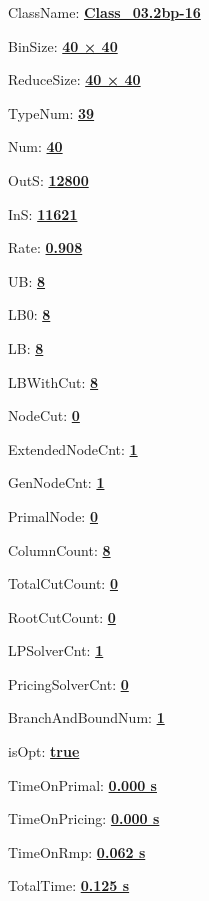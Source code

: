 \documentclass[11pt]{article}
\begin{document}
\pagestyle{empty}


ClassName: \underline{\textbf{Class_03.2bp-16}}
\par
BinSize: \underline{\textbf{40 × 40}}
\par
ReduceSize: \underline{\textbf{40 × 40}}
\par
TypeNum: \underline{\textbf{39}}
\par
Num: \underline{\textbf{40}}
\par
OutS: \underline{\textbf{12800}}
\par
InS: \underline{\textbf{11621}}
\par
Rate: \underline{\textbf{0.908}}
\par
UB: \underline{\textbf{8}}
\par
LB0: \underline{\textbf{8}}
\par
LB: \underline{\textbf{8}}
\par
LBWithCut: \underline{\textbf{8}}
\par
NodeCut: \underline{\textbf{0}}
\par
ExtendedNodeCnt: \underline{\textbf{1}}
\par
GenNodeCnt: \underline{\textbf{1}}
\par
PrimalNode: \underline{\textbf{0}}
\par
ColumnCount: \underline{\textbf{8}}
\par
TotalCutCount: \underline{\textbf{0}}
\par
RootCutCount: \underline{\textbf{0}}
\par
LPSolverCnt: \underline{\textbf{1}}
\par
PricingSolverCnt: \underline{\textbf{0}}
\par
BranchAndBoundNum: \underline{\textbf{1}}
\par
isOpt: \underline{\textbf{true}}
\par
TimeOnPrimal: \underline{\textbf{0.000 s}}
\par
TimeOnPricing: \underline{\textbf{0.000 s}}
\par
TimeOnRmp: \underline{\textbf{0.062 s}}
\par
TotalTime: \underline{\textbf{0.125 s}}
\par
\newpage


\end{document}
